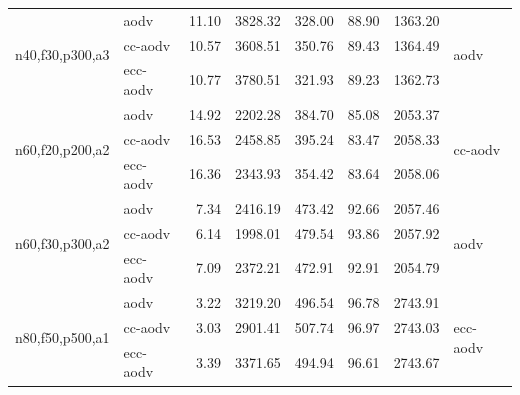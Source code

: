 \documentclass[11pt,a4paper]{article}
\begin{document}
\begin{table}[h]
\begin{tabular}{l l r r r r r l}
\midrule
\multirow{3}{*}{n40,f30,p300,a3}
 & aodv     & \cellcolor{lightgreen}11.10 & \cellcolor{lightgreen}3828.32 & 328.00                       & \cellcolor{lightgreen}88.90 & 1363.20                       & \multirow{3}{*}{aodv} \\
 & cc-aodv  & 10.57                       & 3608.51                       & 350.76                       & 89.43                       & 1364.49                       & \\
 & ecc-aodv & 10.77                       & 3780.51                       & \cellcolor{lightgreen}321.93 & 89.23                       & \cellcolor{lightgreen}1362.73 & \\
\midrule
\multirow{3}{*}{n60,f20,p200,a2}
 & aodv     & 14.92                       & 2202.28                       & 384.70                       & 85.08                       & \cellcolor{lightgreen}2053.37 & \multirow{3}{*}{cc-aodv} \\
 & cc-aodv  & \cellcolor{lightgreen}16.53 & \cellcolor{lightgreen}2458.85 & 395.24                       & \cellcolor{lightgreen}83.47 & 2058.33                       & \\
 & ecc-aodv & 16.36                       & 2343.93                       & \cellcolor{lightgreen}354.42 & 83.64                       & 2058.06                       & \\
\midrule
\multirow{3}{*}{n60,f30,p300,a2}
 & aodv     & \cellcolor{lightgreen}7.34  & \cellcolor{lightgreen}2416.19 & 473.42                       & \cellcolor{lightgreen}92.66 & 2057.46                       & \multirow{3}{*}{aodv} \\
 & cc-aodv  & 6.14                        & 1998.01                       & 479.54                       & 93.86                       & 2057.92                       & \\
 & ecc-aodv & 7.09                        & 2372.21                       & \cellcolor{lightgreen}472.91 & 92.91                       & \cellcolor{lightgreen}2054.79 & \\
\midrule
\multirow{3}{*}{n80,f50,p500,a1}
 & aodv     & 3.22                        & 3219.20                       & 496.54                       & 96.78                       & 2743.91                       & \multirow{3}{*}{ecc-aodv} \\
 & cc-aodv  & 3.03                        & 2901.41                       & 507.74                       & 96.97                       & \cellcolor{lightgreen}2743.03 & \\
 & ecc-aodv & \cellcolor{lightgreen}3.39  & \cellcolor{lightgreen}3371.65 & \cellcolor{lightgreen}494.94 & \cellcolor{lightgreen}96.61 & 2743.67                       & \\

\end{tabular}
\end{table}
\end{document}
